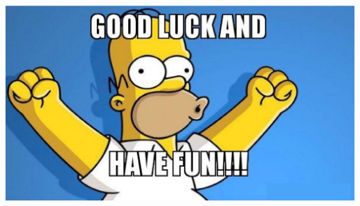 \begin{frame}
	\begin{center}
		\includegraphics[angle=-90, width=\textwidth]{0001}
	\end{center}	

\end{frame}



